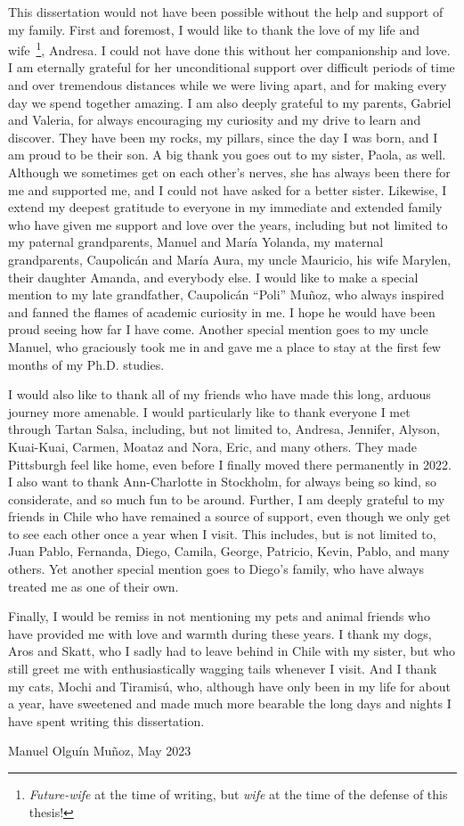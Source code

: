 This dissertation would not have been possible without the help and support of my family.
First and foremost, I would like to thank the love of my life and wife~\footnote{\emph{Future-wife} at the time of writing, but \emph{wife} at the time of the defense of this thesis!}, Andresa.
I could not have done this without her companionship and love.
I am eternally grateful for her unconditional support over difficult periods of time and over tremendous distances while we were living apart, and for making every day we spend together amazing.
I am also deeply grateful to my parents, Gabriel and Valeria, for always encouraging my curiosity and my drive to learn and discover.
They have been my rocks, my pillars, since the day I was born, and I am proud to be their son.
A big thank you goes out to my sister, Paola, as well.
Although we sometimes get on each other's nerves, she has always been there for me and supported me, and I could not have asked for a better sister.
Likewise, I extend my deepest gratitude to everyone in my immediate and extended family who have given me support and love over the years, including but not limited to my paternal grandparents, Manuel and María Yolanda, my maternal grandparents, Caupolicán and María Aura, my uncle Mauricio, his wife Marylen, their daughter Amanda, and everybody else.
I would like to make a special mention to my late grandfather, Caupolicán ``Poli'' Muñoz, who always inspired and fanned the flames of academic curiosity in me.
I hope he would have been proud seeing how far I have come.
Another special mention goes to my uncle Manuel, who graciously took me in and gave me a place to stay at the first few months of my Ph.D. studies.

I would also like to thank all of my friends who have made this long, arduous journey more amenable.
I would particularly like to thank everyone I met through Tartan Salsa, including, but not limited to, Andresa, Jennifer, Alyson, Kuai-Kuai, Carmen, Moataz and Nora, Eric, and many others.
They made Pittsburgh feel like home, even before I finally moved there permanently in 2022.
I also want to thank Ann-Charlotte in Stockholm, for always being so kind, so considerate, and so much fun to be around.
Further, I am deeply grateful to my friends in Chile who have remained a source of support, even though we only get to see each other once a year when I visit.
This includes, but is not limited to, Juan Pablo, Fernanda, Diego, Camila, George, Patricio, Kevin, Pablo, and many others.
Yet another special mention goes to Diego's family, who have always treated me as one of their own.

Finally, I would be remiss in not mentioning my pets and animal friends who have provided me with love and warmth during these years.
I thank my dogs, Aros and Skatt, who I sadly had to leave behind in Chile with my sister, but who still greet me with enthusiastically wagging tails whenever I visit.
And I thank my cats, Mochi and Tiramisú, who, although have only been in my life for about a year, have sweetened and made much more bearable the long days and nights I have spent writing this dissertation.

\medskip
{\begin{flushright}
    Manuel Olguín Muñoz, May 2023
\end{flushright}}
